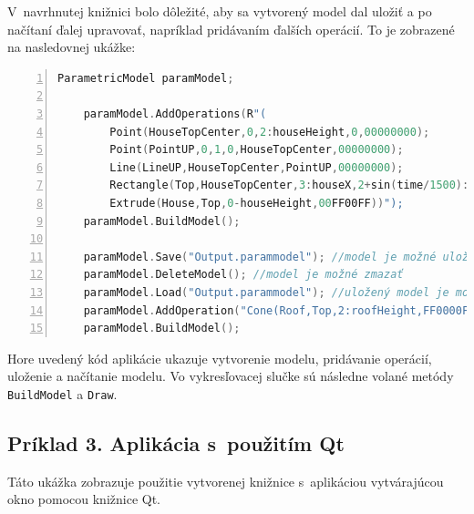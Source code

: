 V~navrhnutej knižnici bolo dôležité, aby sa vytvorený model dal uložiť a po načítaní ďalej upravovať, napríklad pridávaním ďalších operácií. To je zobrazené na nasledovnej ukážke:\nopagebreak 
\vspace{10pt}
\begin{minipage}{\linewidth}
\begin{lstlisting}[language=C,frame=tb,numbers=left,emph={void,int,char,double,float,unsigned},emphstyle={\color{blue}},tabsize=2]
	ParametricModel paramModel;

	paramModel.AddOperations(R"(
        Point(HouseTopCenter,0,2:houseHeight,0,00000000);
        Point(PointUP,0,1,0,HouseTopCenter,00000000);
        Line(LineUP,HouseTopCenter,PointUP,00000000);
        Rectangle(Top,HouseTopCenter,3:houseX,2+sin(time/1500):houseY,&\newline&sin(time/1000)-0.2:rotation,LineUP,00000000);
        Extrude(House,Top,0-houseHeight,00FF00FF))");
	paramModel.BuildModel(); 
	
	paramModel.Save("Output.parammodel"); //model je možné uložiť 
	paramModel.DeleteModel(); //model je možné zmazať
	paramModel.Load("Output.parammodel"); //uložený model je možné znova &\newline&načítať 
	paramModel.AddOperation("Cone(Roof,Top,2:roofHeight,FF0000FF)"); &\newline&//pridanie operácie do načítaného modelu
	paramModel.BuildModel();
\end{lstlisting}
\end{minipage}
Hore uvedený kód aplikácie ukazuje vytvorenie modelu, pridávanie operácií, uloženie a načítanie modelu. Vo vykresľovacej slučke sú následne volané metódy \texttt{BuildModel} a \texttt{Draw}.\newpage

\subsection*{Príklad 3. Aplikácia s~použitím Qt}\label{priklad3}
Táto ukážka zobrazuje použitie vytvorenej knižnice s~aplikáciou vytvárajúcou okno pomocou knižnice Qt. 


